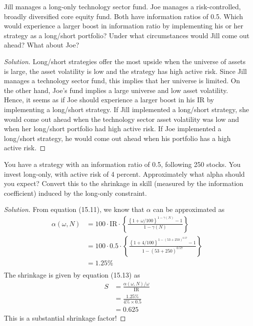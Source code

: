 \begin{problem}{15.1}
  Jill manages a long-only technology sector fund. Joe manages a risk-controlled, broadly diversified core equity fund. Both have information ratios of 0.5. Which would experience a larger boost in information ratio by implementing his or her strategy as a long/short portfolio? Under what circumstances would Jill come out ahead? What about Joe?
\end{problem}

\begin{proof}[Solution]
  Long/short strategies offer the most upside when the universe of assets is large, the asset volatility is low and the strategy has high active risk. Since Jill manages a technology sector fund, this implies that her universe is limited. On the other hand, Joe's fund implies a large universe and low asset volatility. Hence, it seems as if Joe should experience a larger boost in his IR by implementing a long/short strategy. If Jill implemented a long/short strategy, she would come out ahead when the technology sector asset volatility was low and when her long/short portfolio had high active risk. If Joe implemented a long/short strategy, he would come out ahead when his portfolio has a high active risk.
\end{proof}

\begin{problem}{15.2}
  You have a strategy with an information ratio of 0.5, following 250 stocks. You invest long-only, with active risk of 4 percent. Approximately what alpha should you expect? Convert this to the shrinkage in skill (measured by the information coefficient) induced by the long-only constraint.
\end{problem}

\begin{proof}[Solution]
  From equation (15.11), we know that $\alpha$ can be approximated as
  \begin{align*}
   \alpha(\omega,N) &= 100\cdot \mathrm{IR} \cdot \left\{ \frac{ \left\{ 1 + \omega/100 \right\}^{1-\gamma(N)} -1}{1-\gamma(N)}\right\}\\
		    &= 100 \cdot 0.5 \cdot \left\{ \frac{ \left\{ 1 + 4/100 \right\}^{1-(53+250)^{0.57}} -1}{1-(53+250)^{0.57}}\right\}\\
		    &= 1.25 \%\\
  \end{align*}
  The shrinkage is given by equation (15.13) as
  \begin{align*}
   S  &= \frac{\alpha(\omega,N)/\omega}{\mathrm{IR}} \\
      &= \frac{1.25 \%}{4\%\times 0.5} \\
      &= 0.625
  \end{align*}
  This is a substantial shrinkage factor!

\end{proof}

